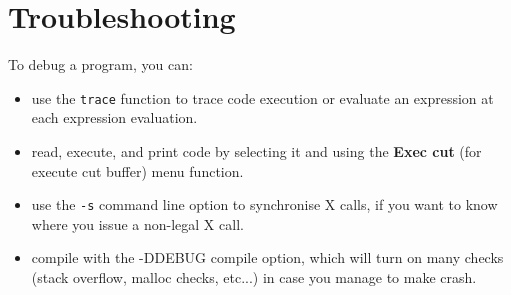 \section{Troubleshooting}

To debug a {\WOOL} program, you can:

\begin{itemize}

\item use the \verb"trace" function to trace code execution or evaluate an
expression at each expression evaluation.

\item read, execute, and print {\WOOL} code by selecting it and using
the {\bf Exec cut} (for execute cut buffer) menu function.

\item use the \verb"-s" command line option to synchronise X calls, if you want
to know where you issue a non-legal X call.

\item compile {\GWM} with the -DDEBUG compile option, which will turn on many
checks (stack overflow, malloc checks, etc...) in case you manage 
to make {\GWM} crash.

\end{itemize}

